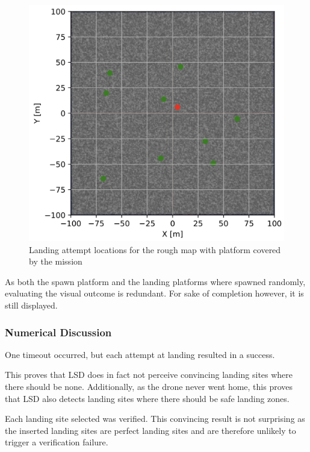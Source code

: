     \begin{figure}[h]
    \centering
    \includegraphics[scale=0.5]{images/evaluation/landing_rough_covered.png}
    \caption{Landing attempt locations for the rough map with platform covered by the mission}
    \label{fig:land_rough_covered} %
    \end{figure}

    As both the spawn platform and the landing platforms where spawned randomly, evaluating the visual outcome is redundant. For sake of completion however, it is still displayed.

    \subsubsection{Numerical Discussion}
    One timeout occurred, but each attempt at landing resulted in a success. 

    This proves that LSD does in fact not perceive convincing landing sites where there should be none. Additionally, as the drone never went home, this proves that LSD also detects landing sites where there should be safe landing zones.
    
    Each landing site selected was verified. This convincing result is not surprising as the inserted landing sites are perfect landing sites and are therefore unlikely to trigger a verification failure.


